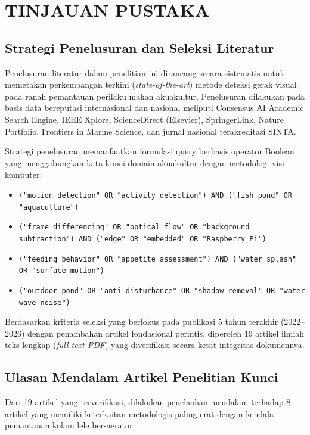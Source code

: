 \section{TINJAUAN PUSTAKA}
\label{sec:tinjauan-pustaka}

\subsection{Strategi Penelusuran dan Seleksi Literatur}
Penelusuran literatur dalam penelitian ini dirancang secara sistematis untuk memetakan perkembangan terkini (\textit{state-of-the-art}) metode deteksi gerak visual pada ranah pemantauan perilaku makan akuakultur. Penelusuran dilakukan pada basis data bereputasi internasional dan nasional meliputi Consensus AI Academic Search Engine, IEEE Xplore, ScienceDirect (Elsevier), SpringerLink, Nature Portfolio, Frontiers in Marine Science, dan jurnal nasional terakreditasi SINTA.

Strategi penelusuran memanfaatkan formulasi query berbasis operator Boolean yang menggabungkan kata kunci domain akuakultur dengan metodologi visi komputer:
\begin{itemize}
    \item \texttt{("motion detection" OR "activity detection") AND ("fish pond" OR "aquaculture")}
    \item \texttt{("frame differencing" OR "optical flow" OR "background subtraction") AND ("edge" OR "embedded" OR "Raspberry Pi")}
    \item \texttt{("feeding behavior" OR "appetite assessment") AND ("water splash" OR "surface motion")}
    \item \texttt{("outdoor pond" OR "anti-disturbance" OR "shadow removal" OR "water wave noise")}
\end{itemize}

Berdasarkan kriteria seleksi yang berfokus pada publikasi 5 tahun terakhir (2022--2026) dengan penambahan artikel fondasional perintis, diperoleh 19 artikel ilmiah teks lengkap (\textit{full-text PDF}) yang diverifikasi secara ketat integritas dokumennya.

\subsection{Ulasan Mendalam Artikel Penelitian Kunci}
Dari 19 artikel yang terverifikasi, dilakukan penelaahan mendalam terhadap 8 artikel yang memiliki keterkaitan metodologis paling erat dengan kendala pemantauan kolam lele ber-aerator:

